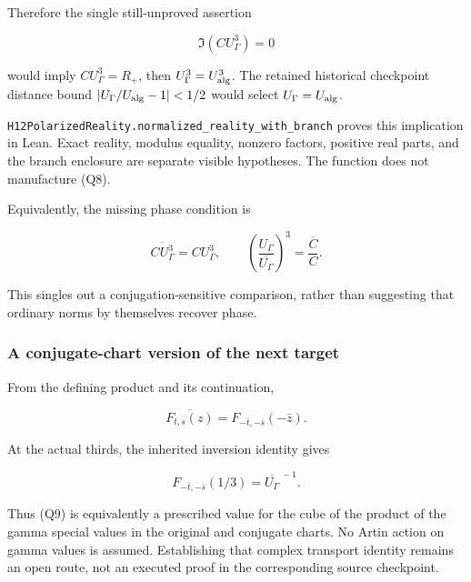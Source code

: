Therefore the single still-unproved assertion

\[
 \boxed{\Im(C U_\Gamma^3)=0} \tag{Q8}
\]

would imply \(C U_\Gamma^3=R_+\), then \(U_\Gamma^3=U_{\rm alg}^3\). The
retained historical checkpoint distance bound \(|U_\Gamma/U_{\rm alg}-1|<1/2\)
would select \(U_\Gamma=U_{\rm alg}\).

\texttt{H12PolarizedReality.normalized\_reality\_with\_branch} proves
this implication in Lean. Exact reality, modulus equality, nonzero
factors, positive real parts, and the branch enclosure are separate
visible hypotheses. The function does not manufacture (Q8).

Equivalently, the missing phase condition is

\[
 \overline{C U_\Gamma^3}=C U_\Gamma^3,
 \qquad
 \left(\frac{U_\Gamma}{\overline{U_\Gamma}}\right)^3
   =\frac{\overline C}{C}. \tag{Q9}
\]

This singles out a conjugation-sensitive comparison, rather than
suggesting that ordinary norms by themselves recover phase.

\hypertarget{Q-a-conjugate-chart-version-of-the-next-target}{%
\subsubsection{A conjugate-chart version of the next
target}\label{Q-a-conjugate-chart-version-of-the-next-target}}

From the defining product and its continuation,

\[
 \overline{F_{t,s}(z)}=F_{-\bar t,-\bar s}(-\bar z).
\]

At the actual thirds, the inherited inversion identity gives

\[
 F_{-\bar t,-\bar s}(1/3)=\overline{U_\Gamma}^{\,-1}.
\]

Thus (Q9) is equivalently a prescribed value for the cube of the product
of the gamma special values in the original and conjugate charts. No
Artin action on gamma values is assumed. Establishing that complex
transport identity remains an open route, not an executed proof in the
corresponding source checkpoint.
